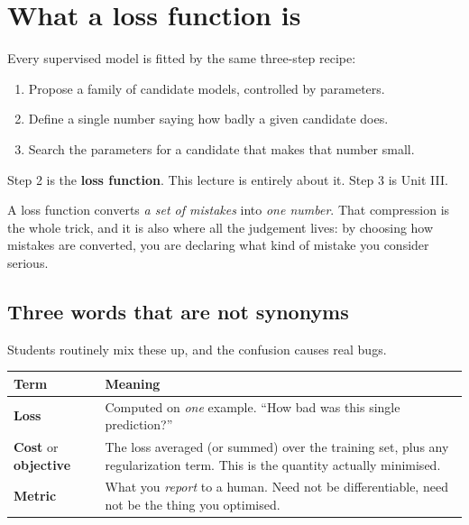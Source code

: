\documentclass[11pt]{article}
\begin{document}
\newpage
\section{What a loss function is}
\label{sec:what}

Every supervised model is fitted by the same three-step recipe:

\begin{enumerate}[leftmargin=*]
  \item Propose a family of candidate models, controlled by parameters.
  \item Define a single number saying how badly a given candidate does.
  \item Search the parameters for a candidate that makes that number small.
\end{enumerate}

Step 2 is the \textbf{loss function}. This lecture is entirely about it.
Step 3 is Unit III.

\begin{keyidea}
A loss function converts \emph{a set of mistakes} into \emph{one number}. That
compression is the whole trick, and it is also where all the judgement lives:
by choosing how mistakes are converted, you are declaring what kind of mistake
you consider serious.
\end{keyidea}

\subsection{Three words that are not synonyms}

Students routinely mix these up, and the confusion causes real bugs.

\begin{center}
\begin{tabular}{@{}lp{10.4cm}@{}}
\toprule
\textbf{Term} & \textbf{Meaning}\\
\midrule
\textbf{Loss} & Computed on \emph{one} example. ``How bad was this single
prediction?''\\[3pt]
\textbf{Cost} or \textbf{objective} & The loss averaged (or summed) over the
training set, plus any regularization term. This is the quantity actually
minimised.\\[3pt]
\textbf{Metric} & What you \emph{report} to a human. Need not be differentiable,
need not be the thing you optimised.\\
\bottomrule
\end{tabular}
\end{center}
\end{document}
